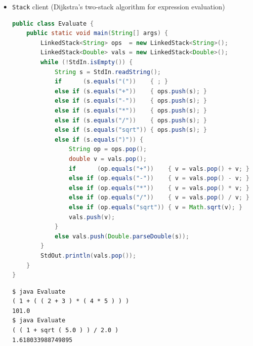 \documentclass[8pt,a4paper,compress]{beamer}
\begin{document}
\begin{frame}[fragile]
\begin{itemize}
\item \lstinline{Stack} client (Dijkstra's two-stack algorithm for expression evaluation)
\begin{lstlisting}[language=Java]
public class Evaluate {
    public static void main(String[] args) { 
        LinkedStack<String> ops  = new LinkedStack<String>();
        LinkedStack<Double> vals = new LinkedStack<Double>();
        while (!StdIn.isEmpty()) {
            String s = StdIn.readString();
            if      (s.equals("("))    { ; }
            else if (s.equals("+"))    { ops.push(s); }
            else if (s.equals("-"))    { ops.push(s); }
            else if (s.equals("*"))    { ops.push(s); }
            else if (s.equals("/"))    { ops.push(s); }
            else if (s.equals("sqrt")) { ops.push(s); }
            else if (s.equals(")")) {
                String op = ops.pop();
                double v = vals.pop();
                if      (op.equals("+"))    { v = vals.pop() + v; }
                else if (op.equals("-"))    { v = vals.pop() - v; } 
                else if (op.equals("*"))    { v = vals.pop() * v; }
                else if (op.equals("/"))    { v = vals.pop() / v; }
                else if (op.equals("sqrt")) { v = Math.sqrt(v); }
                vals.push(v);
            }
            else vals.push(Double.parseDouble(s));
        }
        StdOut.println(vals.pop());
    }
}
\end{lstlisting}

\begin{lstlisting}[language={}]
$ java Evaluate
( 1 + ( ( 2 + 3 ) * ( 4 * 5 ) ) )
101.0
$ java Evaluate
( ( 1 + sqrt ( 5.0 ) ) / 2.0 )
1.618033988749895
\end{lstlisting}
\end{itemize}
\end{frame}
\end{document}
